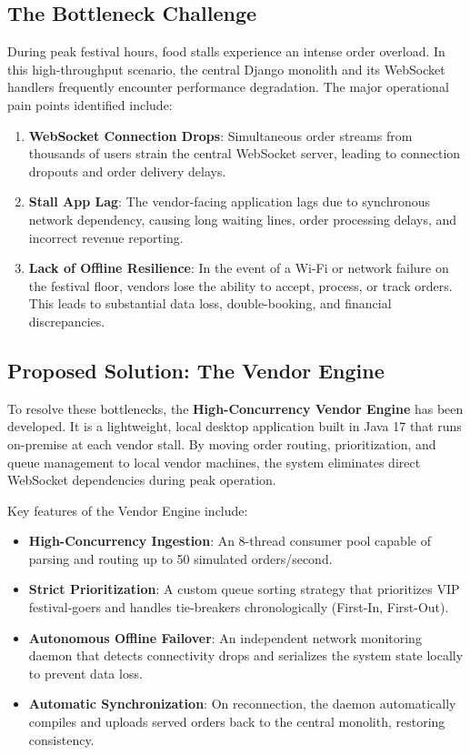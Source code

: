 \subsection{The Bottleneck Challenge}
During peak festival hours, food stalls experience an intense order overload. In this high-throughput scenario, the central Django monolith and its WebSocket handlers frequently encounter performance degradation. The major operational pain points identified include:
\begin{enumerate}
    \item \textbf{WebSocket Connection Drops}: Simultaneous order streams from thousands of users strain the central WebSocket server, leading to connection dropouts and order delivery delays.
    \item \textbf{Stall App Lag}: The vendor-facing application lags due to synchronous network dependency, causing long waiting lines, order processing delays, and incorrect revenue reporting.
    \item \textbf{Lack of Offline Resilience}: In the event of a Wi-Fi or network failure on the festival floor, vendors lose the ability to accept, process, or track orders. This leads to substantial data loss, double-booking, and financial discrepancies.
\end{enumerate}

\subsection{Proposed Solution: The Vendor Engine}
To resolve these bottlenecks, the \textbf{High-Concurrency Vendor Engine} has been developed. It is a lightweight, local desktop application built in Java 17 that runs on-premise at each vendor stall. By moving order routing, prioritization, and queue management to local vendor machines, the system eliminates direct WebSocket dependencies during peak operation. 

Key features of the Vendor Engine include:
\begin{itemize}
    \item \textbf{High-Concurrency Ingestion}: An 8-thread consumer pool capable of parsing and routing up to 50 simulated orders/second.
    \item \textbf{Strict Prioritization}: A custom queue sorting strategy that prioritizes VIP festival-goers and handles tie-breakers chronologically (First-In, First-Out).
    \item \textbf{Autonomous Offline Failover}: An independent network monitoring daemon that detects connectivity drops and serializes the system state locally to prevent data loss.
    \item \textbf{Automatic Synchronization}: On reconnection, the daemon automatically compiles and uploads served orders back to the central monolith, restoring consistency.
\end{itemize}

